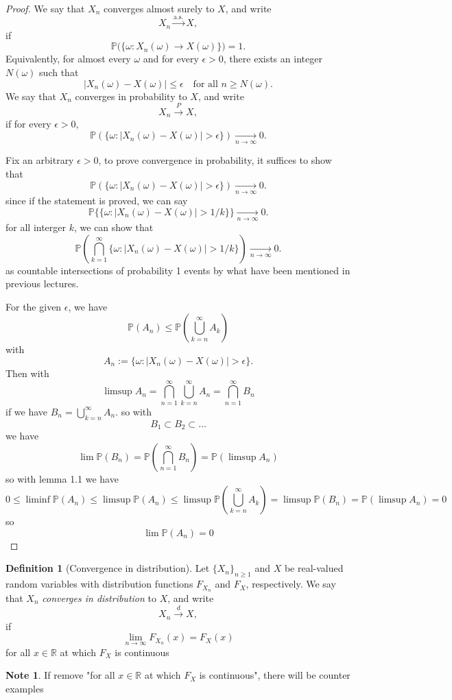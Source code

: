 \documentclass[11pt]{article}
\theoremstyle{definition}
\newtheorem{defn}{Definition}[section]
\newtheorem{note}{Note}[section]
\begin{document}
\begin{proof}

We say that $X_n$ converges almost surely to $X$, and write
\[
X_n \xrightarrow{\text{a.s.}} X,
\]
if
\[
\mathbb P\big(\{\omega : X_n(\omega) \to X(\omega)\}\big) = 1.
\]
Equivalently, for almost every $\omega$ and for every $\epsilon>0$,
there exists an integer $N(\omega)$ such that
\[
|X_n(\omega)-X(\omega)| \le \epsilon
\quad \text{for all } n \ge N(\omega).
\]
We say that $X_n$ converges in probability to $X$, and write
\[
X_n \xrightarrow{P} X,
\]
if for every $\epsilon>0$,
\[
\mathbb P(\{\omega:|X_n(\omega)-X(\omega)|>\epsilon\}) \xrightarrow[n\to\infty]{} 0.
\]

Fix an arbitrary $\epsilon>0$,
to prove convergence in probability, it suffices to show that
\[
\mathbb P(\{\omega:|X_n(\omega)-X(\omega)|>\epsilon\}) \xrightarrow[n\to\infty]{} 0.
\]
since if the statement is proved, we can say
\[
\mathbb P\{\{\omega:|X_n(\omega)-X(\omega)|>1/k\}\}\xrightarrow[n\to\infty]{} 0.
\]
for all interger $k$, we can show that 
\[
\mathbb P(\bigcap_{k=1}^{\infty}\{\omega:|X_n(\omega)-X(\omega)|>1/k\})\xrightarrow[n\to\infty]{} 0.
\]
as countable intersections of probability 1 events by what have been mentioned in previous lectures.

For the given $\epsilon$, we have
$$
\mathbb{P}(A_n)\leq\mathbb{P}(\bigcup_{k=n}^{\infty} A_k)
$$
with
\[
A_n := \{\omega : |X_n(\omega)-X(\omega)|>\epsilon\}.
\]
Then with 
$$
\limsup A_n = \bigcap_{n=1}^{\infty}\bigcup_{k=n}^{\infty} A_n = \bigcap_{n=1}^{\infty} B_n
$$
if we have $B_n = \bigcup_{k=n}^{\infty} A_n$. so with 
$$
B_1\subset B_2 \subset \dots
$$
we have
$$
\lim \mathbb{P}(B_n) = \mathbb{P}(\bigcap_{n=1}^{\infty} B_n) = \mathbb{P}(\limsup A_n)
$$
so with lemma 1.1 we have 
$$
0\leq\liminf\mathbb{P}(A_n)\leq\limsup\mathbb{P}(A_n)\leq\limsup\mathbb{P}(\bigcup_{k=n}^{\infty} A_k) = \limsup\mathbb{P}(B_n)=\mathbb{P}(\limsup A_n)=0
$$
so
$$
\lim \mathbb{P}(A_n) = 0
$$
\end{proof}
\begin{defn}[Convergence in distribution]
Let $\{X_n\}_{n\ge 1}$ and $X$ be real-valued random variables with distribution
functions $F_{X_n}$ and $F_X$, respectively. We say that $X_n$ \emph{converges in distribution}
to $X$, and write
\[
X_n \xrightarrow{d} X,
\]
if
\[
\lim_{n \to \infty} F_{X_n}(x) = F_X(x)
\]
for all $x \in \mathbb{R}$ at which $F_X$ is continuous
\end{defn}
\begin{note}
If remove "for all $x \in \mathbb{R}$ at which $F_X$ is continuous", there will be counter examples
\end{note}
\end{document}
